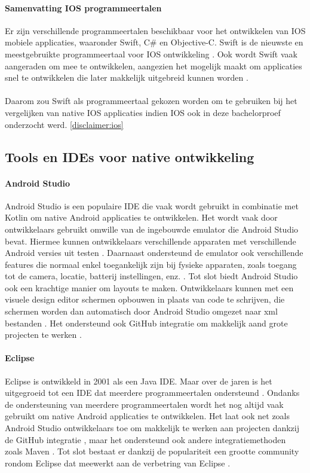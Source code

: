 \paragraph{Samenvatting IOS programmeertalen}
Er zijn verschillende programmeertalen beschikbaar voor het ontwikkelen van IOS 
mobiele applicaties, waaronder Swift, C\# en Objective-C. Swift is de nieuwste en 
meestgebruikte programmeertaal voor IOS ontwikkeling \autocite{yuvraj2022}. Ook 
wordt Swift vaak aangeraden om mee te ontwikkelen, aangezien het mogelijk maakt om 
applicaties snel te ontwikkelen die later makkelijk uitgebreid kunnen 
worden \autocite{Pruciak2022}. 
\\\\
Daarom zou Swift als programmeertaal gekozen worden om te gebruiken bij het vergelijken van 
native IOS applicaties indien IOS ook in deze bachelorproef onderzocht werd. \ref{disclaimer:ios}

\subsection{Tools en IDEs voor native ontwikkeling}

\paragraph{Android Studio}
Android Studio is een populaire IDE die vaak wordt gebruikt in combinatie met 
Kotlin om native Android applicaties te ontwikkelen. Het wordt vaak door ontwikkelaars 
gebruikt omwille van de ingebouwde \Gls{emulator} die Android Studio bevat. Hiermee 
kunnen ontwikkelaars verschillende apparaten met verschillende Android versies uit 
testen \autocite{Medewar2022}. Daarnaast ondersteund de emulator ook verschillende 
features die normaal enkel toegankelijk zijn bij fysieke apparaten, zoals toegang tot 
de camera, locatie, batterij instellingen, enz. \autocite{Okeke2022}. Tot slot biedt 
Android Studio ook een krachtige manier om layouts te maken. Ontwikkelaars kunnen met 
een visuele design editor schermen opbouwen in plaats van code te schrijven, die schermen 
worden dan automatisch door Android Studio omgezet naar xml bestanden \autocite{Medewar2022}. 
Het ondersteund ook GitHub integratie om makkelijk aand grote projecten te werken \autocite{Studio2023}.

\paragraph{Eclipse}
Eclipse is ontwikkeld in 2001 als een Java IDE. Maar over de jaren is het uitgegroeid 
tot een IDE dat meerdere programmeertalen ondersteund \autocite{Medewar2022}. Ondanks 
de ondersteuning van meerdere programmeertalen wordt het nog altijd vaak gebruikt om native 
Android applicaties te ontwikkelen. Het laat ook net zoals Android Studio ontwikkelaars toe 
om makkelijk te werken aan projecten dankzij de GitHub integratie \autocite{Okeke2022}, maar 
het ondersteund ook andere integratiemethoden zoals Maven \autocite{Medewar2022}. Tot slot 
bestaat er dankzij de populariteit een grootte community rondom Eclipse dat meewerkt aan de 
verbetring van Eclipse \autocite{Medewar2022}.

